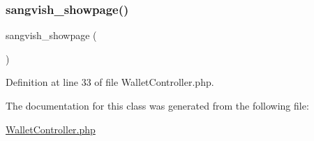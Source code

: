 \subsubsection{\texorpdfstring{sangvish\_showpage()}{sangvish\_showpage()}}
{\footnotesize\ttfamily sangvish\+\_\+showpage (\begin{DoxyParamCaption}{ }\end{DoxyParamCaption})}



Definition at line 33 of file Wallet\+Controller.\+php.



The documentation for this class was generated from the following file\+:\begin{DoxyCompactItemize}
\item 
\mbox{\hyperlink{_wallet_controller_8php}{Wallet\+Controller.\+php}}\end{DoxyCompactItemize}
